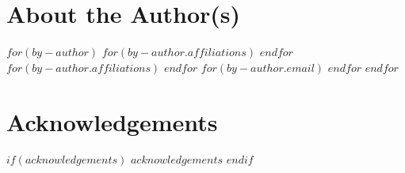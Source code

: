 \newpage


\section*{About the Author(s)}

$for(by-author)$
  {}%
  $for(by-author.affiliations)$
    \vskip 1pt{}%
  $endfor$ 
  $for(by-author.affiliations)$
    \vskip -8pt{}%
  $endfor$ 
  $for(by-author.email)$
    \vskip -8pt{}%
  $endfor$ 
  \vskip 15pt
$endfor$

\newpage


\section*{Acknowledgements}


$if(acknowledgements)$
  $acknowledgements$
$endif$

\newpage


